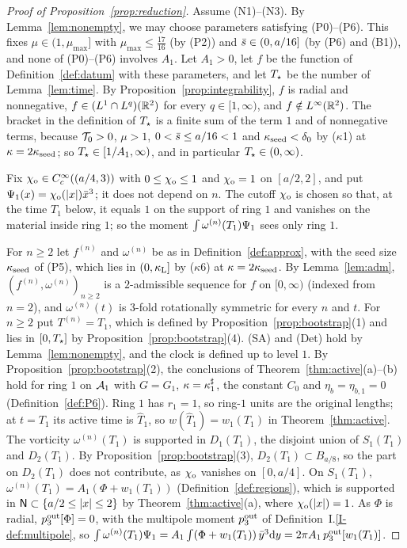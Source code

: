\begin{proof}[Proof of Proposition~\ref{prop:reduction}]
Assume \textup{(N1)}--\textup{(N3)}. By Lemma~\ref{lem:nonempty}, we may choose
parameters satisfying (P0)--(P6). This fixes $\mu\in(1,\mu_{\max}]$ with
$\mu_{\max}\le\frac{17}{16}$ (by (P2)) and $\bar s\in(0,a/16]$ (by (P6) and
(B1)), and none of (P0)--(P6) involves $A_1$. Let $A_1>0$, let $f$ be the
function of Definition~\ref{def:datum} with these parameters, and let $T_\star$ be the number of
Lemma~\ref{lem:time}. By Proposition~\ref{prop:integrability}, $f$ is radial
and nonnegative, $f\in (L^1\cap L^q)(\mathbb{R}^2)$ for every $q\in[1,\infty)$, and
$f\notin L^\infty(\mathbb{R}^2)$. The bracket in the definition of $T_\star$ is a finite
sum of the term $1$ and of nonnegative terms, because $\mathcal{T}_0>0$, $\mu>1$,
$0<\bar s\le a/16<1$ and $\kappa_{\mathrm{seed}}<\delta_0$ by ($\kappa$1) at $\kappa=2\kappa_{\mathrm{seed}}$;
so $T_\star\in[1/A_1,\infty)$, and in particular $T_\star\in(0,\infty)$.

Fix $\chi_{\mathrm{o}}\in C_c^\infty((a/4,3))$ with $0\le\chi_{\mathrm{o}}\le1$ and $\chi_{\mathrm{o}}=1$ on
$[a/2,2]$, and put $\Psi_1(x)=\chi_{\mathrm{o}}(|x|)\bar x^3$; it does not depend on
$n$. The cutoff $\chi_{\mathrm{o}}$ is chosen so that, at the time $T_1$ below, it equals
$1$ on the support of ring $1$ and vanishes on the material inside ring $1$; so
the moment $\int\omega^{(n)}(T_1)\Psi_1$ sees only ring $1$.

For $n\ge2$ let $f^{(n)}$ and $\omega^{(n)}$ be as in Definition~\ref{def:approx},
with the seed size $\kappa_{\mathrm{seed}}$ of (P5), which lies in $(0,\kappa_{\mathrm{L}}]$ by ($\kappa$6) at
$\kappa=2\kappa_{\mathrm{seed}}$. By Lemma~\ref{lem:adm}, $(f^{(n)},\omega^{(n)})_{n\ge2}$ is a
$2$-admissible sequence for $f$ on $[0,\infty)$ (indexed from $n=2$), and
$\omega^{(n)}(t)$ is $3$-fold rotationally symmetric for every $n$ and $t$.
For $n\ge2$ put $T^{(n)}=T_1$, which is defined by
Proposition~\ref{prop:bootstrap}(1) and lies in $[0,T_\star]$ by
Proposition~\ref{prop:bootstrap}(4). (SA) and (Det) hold by
Lemma~\ref{lem:nonempty}, and the clock is defined up to level $1$. By
Proposition~\ref{prop:bootstrap}(2), the conclusions of
Theorem~\ref{thm:active}(a)--(b) hold for ring $1$ on $\mathcal{A}_1$ with $G=G_1$,
$\kappa=\kappa^\sharp_1$, the constant $C_0$ and $\eta_b=\eta_{b,1}=0$
(Definition~\ref{def:P6}). Ring $1$ has
$r_1=1$, so ring-$1$ units are the original lengths; at $t=T_1$ its active time
is $\hat T_1$, so $w(\hat T_1)=w_1(T_1)$ in Theorem~\ref{thm:active}. The
vorticity $\omega^{(n)}(T_1)$ is supported in $D_1(T_1)$, the disjoint union of
$S_1(T_1)$ and $D_2(T_1)$. By Proposition~\ref{prop:bootstrap}(3),
$D_2(T_1)\subset B_{a/8}$, so the part on $D_2(T_1)$ does not
contribute, as $\chi_{\mathrm{o}}$ vanishes on $[0,a/4]$. On $S_1(T_1)$,
$\omega^{(n)}(T_1)=A_1(\Phi+w_1(T_1))$ (Definition~\ref{def:regions}), which is
supported in $\mathsf{N}\subset\{a/2\le|x|\le2\}$ by Theorem~\ref{thm:active}(a), where
$\chi_{\mathrm{o}}(|x|)=1$. As $\Phi$ is radial, $p^{\mathrm{out}}_3[\Phi]=0$, with the
multipole moment $p^{\mathrm{out}}_3$ of Definition~I.\ref{I-def:multipole}, so
$\int\omega^{(n)}(T_1)\Psi_1=A_1\int(\Phi+w_1(T_1))\,\bar y^3\dd y=2\pi A_1\,p^{\mathrm{out}}_3[w_1(T_1)]$.


\end{proof}
